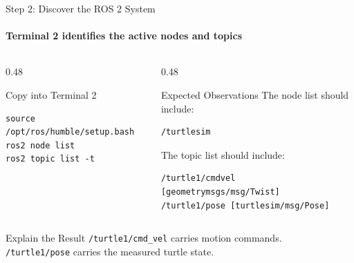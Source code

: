 \begin{frame}[fragile]{Step 2: Discover the ROS 2 System}
\framesubtitle{Terminal 2 identifies the active nodes and topics}

\footnotesize

\begin{columns}[T,onlytextwidth]

    \begin{column}{0.48\textwidth}
        \begin{block}{Copy into Terminal 2}
\begin{verbatim}
source /opt/ros/humble/setup.bash
ros2 node list
ros2 topic list -t
\end{verbatim}
        \end{block}
    \end{column}

    \begin{column}{0.48\textwidth}
        \pause
        \begin{exampleblock}{Expected Observations}
            The node list should include:
\begin{verbatim}
/turtlesim
\end{verbatim}
            
            The topic list should include:
\begin{verbatim}
/turtle1/cmdvel [geometrymsgs/msg/Twist]
/turtle1/pose [turtlesim/msg/Pose]
\end{verbatim}
        \end{exampleblock}
    \end{column}

\end{columns}

\pause
\vspace{0.15cm}

\begin{alertblock}{Explain the Result}
    \texttt{/turtle1/cmd\_vel} carries motion commands. \\
    \texttt{/turtle1/pose} carries the measured turtle state.
\end{alertblock}

\end{frame}
